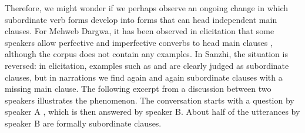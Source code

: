 Therefore, we might wonder if we perhaps observe an ongoing change in which subordinate verb forms develop into forms that can head independent main clauses. For Mehweb Dargwa, it has been observed in elicitation that some speakers allow perfective and imperfective converbs to head main clauses \citep{KustovaForthcoming}, although the corpus does not contain any examples. In Sanzhi, the situation is reversed: in elicitation, examples such as  and  are clearly judged as subordinate clauses, but in narrations we find again and again subordinate clauses with a missing main clause. The following excerpt from a discussion between two speakers illustrates the phenomenon. The conversation starts with a question by speaker A , which is then answered by speaker B. About half of the utterances by speaker B are formally subordinate clauses.
%
